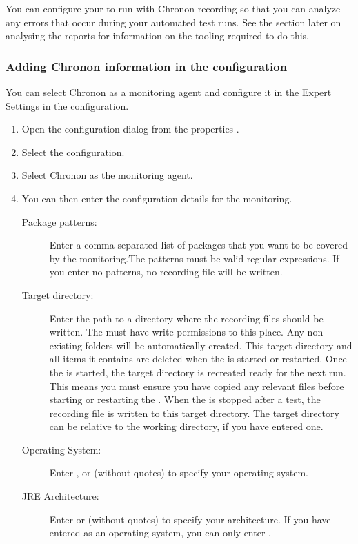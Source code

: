 You can configure your \gdaut{} to run with Chronon recording so that you can analyze any errors that occur during your automated test runs. See the section later  on analysing the reports for information on the tooling required to do this.


\subsubsection{Adding Chronon information in the \gdaut{} configuration}
You can select Chronon as a monitoring agent and configure it in the Expert Settings in the \gdaut{} configuration. 

\begin{enumerate}
\item Open the \gdaut{} configuration dialog from the \gdproject{} properties .
\item Select the  configuration. 
\item Select Chronon as the monitoring agent. 
\item You can then enter the configuration details for the monitoring. 
\begin{description}
\item [Package patterns:]{Enter a comma-separated list of packages that you want to be covered by the monitoring.The patterns must be  valid regular expressions. If you enter no patterns, no recording file will be written.}
\item [Target directory:]{Enter the path to a directory where the recording files should be written. The \gdaut{} must have write permissions to this place. Any non-existing folders will be automatically created. This target directory and all items it contains are deleted when the \gdaut{} is started or restarted. Once the \gdaut{} is started, the target directory is recreated ready for the next run. This means you must ensure you have copied any relevant files before starting or restarting the \gdaut{}. When the \gdaut{} is stopped after a test, the recording file is written to this target directory. The target directory can be relative to the \gdaut{} working directory, if you have entered one.}
\item [Operating System:]{Enter  ,  or  (without quotes) to specify your operating system. }
\item[JRE Architecture:]{Enter  or  (without quotes) to specify your architecture. If you have entered  as an operating system, you can only enter .}
\end{description}
\end{enumerate}

